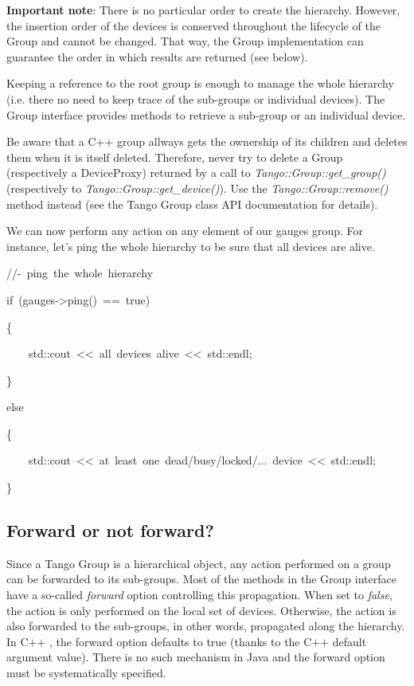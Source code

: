 \textbf{Important note}: There is no particular order to create the
hierarchy. However, the insertion order of the devices is conserved
throughout the lifecycle of the Group and cannot be changed. That
way, the Group implementation can guarantee the order in which results
are returned (see below). 

Keeping a reference to the root group is enough to manage
the whole hierarchy (i.e. there no need to keep trace of the sub-groups
or individual devices). The Group interface provides methods to retrieve
a sub-group or an individual device. 

Be aware that a C++ group allways gets the ownership of its children
and deletes them when it is itself deleted. Therefore, never try to
delete a Group (respectively a DeviceProxy) returned by a call to
\emph{Tango::Group::get\_group()} (respectively
to \emph{Tango::Group::get\_device()}). Use the
\emph{Tango::Group::remove()} method instead (see the
Tango Group class API documentation for details). 

We can now perform any action on any element of our \textquotedbl{}gauges\textquotedbl{}
group. For instance, let's ping the whole hierarchy to be sure that
all devices are alive.


\begin{lyxcode}
//-~ping~the~whole~hierarchy~

if~(gauges->ping()~==~true)

\{

~~~~std::cout~<\textcompwordmark{}<~\textquotedbl{}all~devices~alive\textquotedbl{}~<\textcompwordmark{}<~std::endl;

\}

else

\{

~~~~std::cout~<\textcompwordmark{}<~\textquotedbl{}at~least~one~dead/busy/locked/...~device\textquotedbl{}~<\textcompwordmark{}<~std::endl;

\}
\end{lyxcode}
 

\subsection{Forward or not forward?}

Since a Tango Group is a hierarchical object, any action performed
on a group can be forwarded to its sub-groups. Most of the methods
in the Group interface have a so-called \emph{forward} option controlling
this propagation. When set to \emph{false}, the action is only performed
on the local set of devices. Otherwise, the action is also forwarded
to the sub-groups, in other words, propagated along the hierarchy.
In C++ , the forward option defaults to true (thanks to the C++ default
argument value). There is no such mechanism in Java and the forward
option must be systematically specified.


